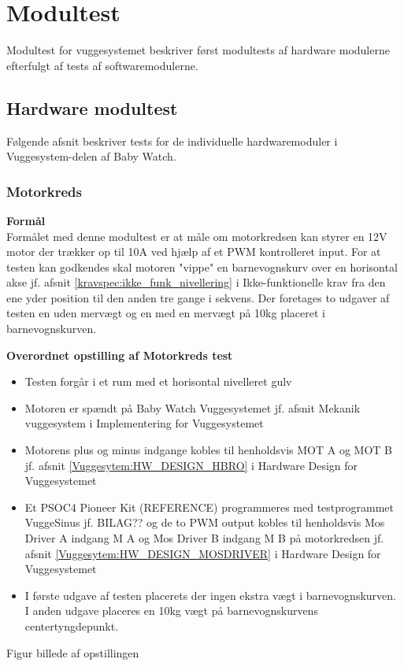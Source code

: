 \section{Modultest}
Modultest for vuggesystemet beskriver først modultests af hardware modulerne efterfulgt af tests af softwaremodulerne. 
\subsection{Hardware modultest}
Følgende afsnit beskriver tests for de individuelle hardwaremoduler i Vuggesystem-delen af Baby Watch.
\subsubsection{Motorkreds}
\textbf{Formål} \\
Formålet med denne modultest er at måle om motorkredsen kan styrer en 12V motor der trækker op til 10A ved hjælp af et PWM kontrolleret input. For at testen kan godkendes skal motoren "vippe" en barnevognskurv over en horisontal akse jf. afsnit \ref{kravspec:ikke_funk_nivellering} i Ikke-funktionelle krav fra den ene yder position til den anden tre gange i sekvens. Der foretages to udgaver af testen en uden mervægt og en med en mervægt på 10kg placeret i barnevognskurven.

\textbf{Overordnet opstilling af Motorkreds test}

\begin{itemize}
	\item Testen forgår i et rum med et horisontal nivelleret gulv
	\item Motoren er spændt på Baby Watch Vuggesystemet jf. afsnit Mekanik vuggesystem i Implementering for Vuggesystemet
	\item Motorens plus og minus indgange kobles til henholdsvis MOT A og MOT B jf. afsnit \ref{Vuggesytem:HW_DESIGN_HBRO} i Hardware Design for Vuggesystemet
	\item Et PSOC4 Pioneer Kit (REFERENCE) programmeres med testprogrammet VuggeSinus jf. BILAG?? og de to PWM output kobles til henholdsvis Mos Driver A indgang M A og Mos Driver B indgang M B på motorkredsen jf. afsnit \ref{Vuggesytem:HW_DESIGN_MOSDRIVER} i Hardware Design for Vuggesystemet
	\item I første udgave af testen placerets der ingen ekstra vægt i barnevognskurven. I anden udgave placeres en 10kg vægt på barnevognskurvens centertyngdepunkt.
\end{itemize}

Figur billede af opstillingen

